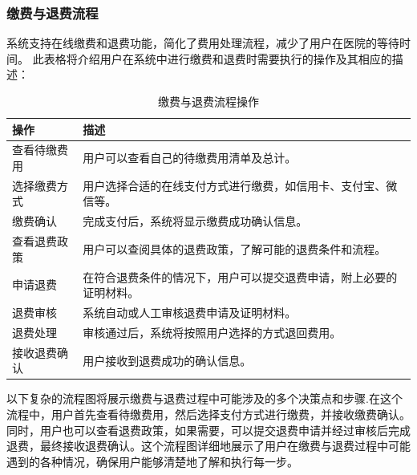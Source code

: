 \subsubsection{缴费与退费流程}
系统支持在线缴费和退费功能，简化了费用处理流程，减少了用户在医院的等待时间。
此表格将介绍用户在系统中进行缴费和退费时需要执行的操作及其相应的描述：
\begin{table}[htbp]
	\centering
	\begin{tabular}{|p{6cm}|p{6cm}|}
		\hline
		\textbf{操作} & \textbf{描述} \\
		\hline
		查看待缴费用 & 用户可以查看自己的待缴费用清单及总计。 \\
		选择缴费方式 & 用户选择合适的在线支付方式进行缴费，如信用卡、支付宝、微信等。 \\
		缴费确认 & 完成支付后，系统将显示缴费成功确认信息。 \\
		查看退费政策 & 用户可以查阅具体的退费政策，了解可能的退费条件和流程。 \\
		申请退费 & 在符合退费条件的情况下，用户可以提交退费申请，附上必要的证明材料。 \\
		退费审核 & 系统自动或人工审核退费申请及证明材料。 \\
		退费处理 & 审核通过后，系统将按照用户选择的方式退回费用。 \\
		接收退费确认 & 用户接收到退费成功的确认信息。 \\
		\hline
	\end{tabular}
	\caption{缴费与退费流程操作}
\end{table}
以下复杂的流程图将展示缴费与退费过程中可能涉及的多个决策点和步骤.在这个流程中，用户首先查看待缴费用，然后选择支付方式进行缴费，并接收缴费确认。同时，用户也可以查看退费政策，如果需要，可以提交退费申请并经过审核后完成退费，最终接收退费确认。这个流程图详细地展示了用户在缴费与退费过程中可能遇到的各种情况，确保用户能够清楚地了解和执行每一步。

